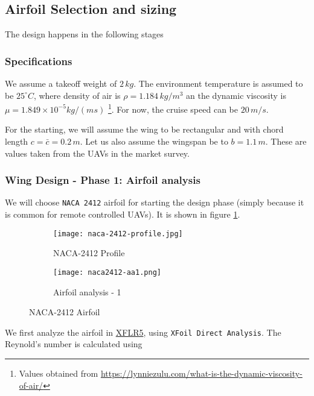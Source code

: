 \subsection{Airfoil Selection and sizing}

The design happens in the following stages

\subsubsection*{Specifications}

We assume a takeoff weight of $2\,kg$. The environment temperature is assumed to be $25^\circ C$, where density of air is $\rho = 1.184\,kg/m^3$ an the dynamic viscosity is $\mu = 1.849 \times 10^{-5} kg/(ms)$ \footnote{Values obtained from \url{https://lynniezulu.com/what-is-the-dynamic-viscosity-of-air/}}. For now, the cruise speed can be $20\,m/s$.

For the starting, we will assume the wing to be rectangular and with chord length $c = \bar{c} = 0.2\,m$. Let us also assume the wingspan be to $b = 1.1\,m$. These are values taken from the UAVs in the market survey.

\subsubsection*{Wing Design - Phase 1: Airfoil analysis}

We will choose \texttt{NACA 2412} airfoil for starting the design phase (simply because it is common for remote controlled UAVs). It is shown in figure \ref{fig:naca-2412-prof}.


\begin{figure}[ht]
    \centering
    \begin{subfigure}[b]{0.45\textwidth}
        \texttt{[image: naca-2412-profile.jpg]}
        \caption{NACA-2412 Profile}
        \label{fig:naca-2412-prof}
    \end{subfigure}
    \begin{subfigure}[b]{0.45\textwidth}
        \texttt{[image: naca2412-aa1.png]}
        \caption{Airfoil analysis - 1}
        \label{fig:naca-2412-aa1}
    \end{subfigure}
    \caption{NACA-2412 Airfoil}
\end{figure}

We first analyze the airfoil in \href{https://www.xflr5.tech/xflr5.htm}{XFLR5}, using \texttt{XFoil Direct Analysis}. The Reynold's number is calculated using

